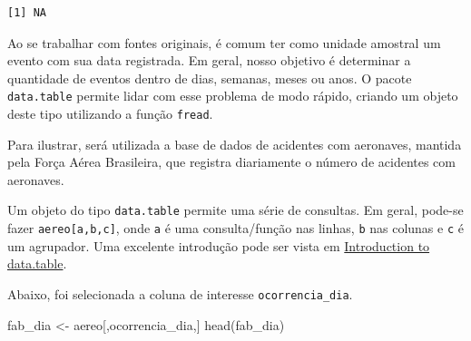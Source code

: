 \documentclass[
  letterpaper,
  DIV=11,
  numbers=noendperiod]{scrreprt}
\newenvironment{Shaded}{\begin{snugshade}}{\end{snugshade}}
\newcommand{\AttributeTok}[1]{\textcolor[rgb]{0.40,0.45,0.13}{#1}}
\newcommand{\FunctionTok}[1]{\textcolor[rgb]{0.28,0.35,0.67}{#1}}
\newcommand{\NormalTok}[1]{\textcolor[rgb]{0.00,0.23,0.31}{#1}}
\newcommand{\OtherTok}[1]{\textcolor[rgb]{0.00,0.23,0.31}{#1}}
\newcommand{\SpecialCharTok}[1]{\textcolor[rgb]{0.37,0.37,0.37}{#1}}
\newcommand{\StringTok}[1]{\textcolor[rgb]{0.13,0.47,0.30}{#1}}
\theoremstyle{definition}
\theoremstyle{plain}
\theoremstyle{definition}
\theoremstyle{plain}
\theoremstyle{remark}
\begin{document}
\begin{verbatim}
[1] NA
\end{verbatim}

Ao se trabalhar com fontes originais, é comum ter como unidade amostral
um evento com sua data registrada. Em geral, nosso objetivo é determinar
a quantidade de eventos dentro de dias, semanas, meses ou anos. O pacote
\texttt{data.table} permite lidar com esse problema de modo rápido,
criando um objeto deste tipo utilizando a função \texttt{fread}.

Para ilustrar, será utilizada a base de dados de acidentes com
aeronaves, mantida pela Força Aérea Brasileira, que registra diariamente
o número de acidentes com aeronaves.

\begin{Shaded}
\end{Shaded}

Um objeto do tipo \texttt{data.table} permite uma série de consultas. Em
geral, pode-se fazer \texttt{aereo{[}a,b,c{]}}, onde \texttt{a} é uma
consulta/função nas linhas, \texttt{b} nas colunas e \texttt{c} é um
agrupador. Uma excelente introdução pode ser vista em
\href{https://cran.r-project.org/web/packages/data.table/vignettes/datatable-intro.html}{Introduction
to data.table}.

Abaixo, foi selecionada a coluna de interesse \texttt{ocorrencia\_dia}.

\begin{Shaded}
\begin{Highlighting}[]
\NormalTok{fab\_dia }\OtherTok{\textless{}{-}}\NormalTok{ aereo[,}\StringTok{\textquotesingle{}ocorrencia\_dia\textquotesingle{}}\NormalTok{,]}
\FunctionTok{head}\NormalTok{(fab\_dia)}
\end{Highlighting}
\end{Shaded}
\end{document}
